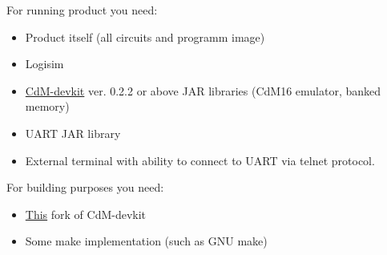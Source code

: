 For running product you need:

\begin{itemize}
	\item Product itself (all circuits and programm image)
	\item Logisim
	\item \href{https://github.com/cdm-processors/cdm-devkit}{CdM-devkit} ver. 0.2.2 or above JAR libraries (CdM16 emulator, banked memory)
	\item UART JAR library
	\item External terminal with ability to connect to UART via telnet protocol.
\end{itemize}

For building purposes you need:

\begin{itemize}
	\item \href{https://github.com/Proletcultist/cdm-devkit-macro-improvements}{This} fork of CdM-devkit
	\item Some make implementation (such as GNU make)
\end{itemize}

